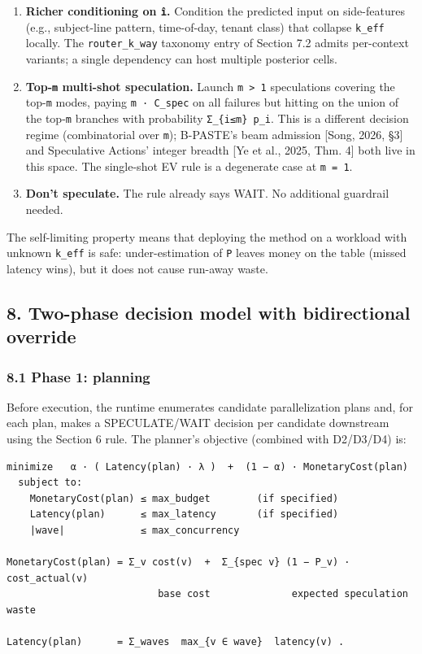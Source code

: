 \documentclass[
  11pt,
]{article}
\providecommand{\tightlist}{%
  \setlength{\itemsep}{0pt}\setlength{\parskip}{0pt}}
\begin{document}
\begin{enumerate}
\def\labelenumi{\arabic{enumi}.}
\tightlist
\item
  \textbf{Richer conditioning on \texttt{î}.} Condition the predicted
  input on side-features (e.g., subject-line pattern, time-of-day,
  tenant class) that collapse \texttt{k\_eff} locally. The
  \texttt{router\_k\_way} taxonomy entry of Section 7.2 admits
  per-context variants; a single dependency can host multiple posterior
  cells.
\item
  \textbf{Top-\texttt{m} multi-shot speculation.} Launch
  \texttt{m\ \textgreater{}\ 1} speculations covering the top-\texttt{m}
  modes, paying \texttt{m\ ·\ C\_spec} on all failures but hitting on
  the union of the top-\texttt{m} branches with probability
  \texttt{Σ\_\{i≤m\}\ p\_i}. This is a different decision regime
  (combinatorial over \texttt{m}); B-PASTE's beam admission {[}Song,
  2026, §3{]} and Speculative Actions' integer breadth {[}Ye et al.,
  2025, Thm. 4{]} both live in this space. The single-shot EV rule is a
  degenerate case at \texttt{m\ =\ 1}.
\item
  \textbf{Don't speculate.} The rule already says WAIT. No additional
  guardrail needed.
\end{enumerate}

The self-limiting property means that deploying the method on a workload
with unknown \texttt{k\_eff} is safe: under-estimation of \texttt{P}
leaves money on the table (missed latency wins), but it does not cause
run-away waste.

\subsection{8. Two-phase decision model with bidirectional
override}\label{two-phase-decision-model-with-bidirectional-override}

\subsubsection{8.1 Phase 1: planning}\label{phase-1-planning}

Before execution, the runtime enumerates candidate parallelization plans
and, for each plan, makes a SPECULATE/WAIT decision per candidate
downstream using the Section 6 rule. The planner's objective (combined
with D2/D3/D4) is:

\begin{verbatim}
minimize   α · ( Latency(plan) · λ )  +  (1 − α) · MonetaryCost(plan)
  subject to:
    MonetaryCost(plan) ≤ max_budget        (if specified)
    Latency(plan)      ≤ max_latency       (if specified)
    |wave|             ≤ max_concurrency

MonetaryCost(plan) = Σ_v cost(v)  +  Σ_{spec v} (1 − P_v) · cost_actual(v)
                          base cost              expected speculation waste

Latency(plan)      = Σ_waves  max_{v ∈ wave}  latency(v) .
\end{verbatim}
\end{document}

